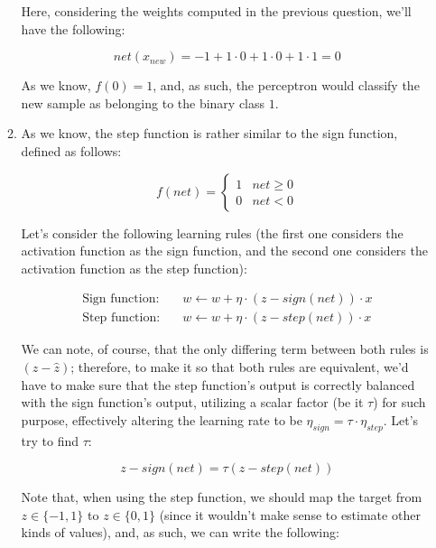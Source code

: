 \documentclass[12pt]{article}
\begin{document}
\begin{enumerate}[leftmargin=\labelsep]
\begin{enumerate}
{          Here, considering the weights computed in the previous question, we'll
          have the following:

          $$
            net(x_{new}) = -1 + 1 \cdot 0 + 1 \cdot 0 + 1 \cdot 1 = 0
          $$

          As we know, $f(0) = 1$, and, as such, the perceptron would classify the
          new sample as belonging to the binary class $1$.
          }
    \item {
          As we know, the step function is rather similar to the sign function,
          defined as follows:

          $$
            f(net) = \begin{cases}
              1 & net \geq 0 \\
              0 & net < 0
            \end{cases}
          $$

          Let's consider the following learning rules (the first one considers
          the activation function as the sign function, and the second one
          considers the activation function as the step function):

          \begin{align*}
            \text{Sign function:} \quad & w \leftarrow w + \eta \cdot (z - sign(net)) \cdot x \\
            \text{Step function:} \quad & w \leftarrow w + \eta \cdot (z - step(net)) \cdot x
          \end{align*}

          We can note, of course, that the only differing term between both rules
          is $(z - \hat{z})$; therefore, to make it so that both rules are
          equivalent, we'd have to make sure that the step function's output
          is correctly balanced with the sign function's output, utilizing a scalar
          factor (be it $\tau$) for such purpose, effectively altering the learning
          rate to be $\eta_{sign} = \tau \cdot \eta_{step}$. Let's try to find $\tau$:

          $$
            z - sign(net) = \tau (z - step(net))
          $$

          Note that, when using the step function, we should map the target from
          $z \in \{-1, 1\}$ to $z \in \{0, 1\}$ (since it wouldn't make sense to
          estimate other kinds of values), and, as such, we can write
          the following:

}
\end{enumerate}
\end{enumerate}
\end{document}

